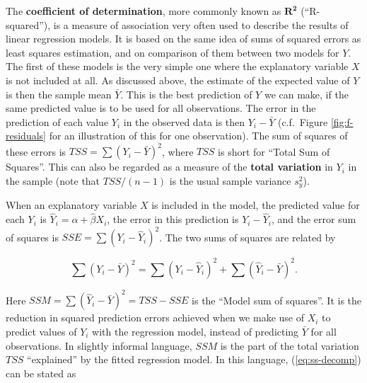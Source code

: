 \documentclass[11pt,a4paper,openany]{book}
\begin{document}
The \textbf{coefficient of determination}, more commonly known as
\(\mathbf{R^{2}}\) (``R-squared''), is a measure of association very
often used to describe the results of linear regression models. It is
based on the same idea of sums of squared errors as least squares
estimation, and on comparison of them between two models for \(Y\). The
first of these models is the very simple one where the explanatory
variable \(X\) is not included at all. As discussed above, the estimate
of the expected value of \(Y\) is then the sample mean \(\bar{Y}\). This
is the best prediction of \(Y\) we can make, if the same predicted value
is to be used for all observations. The error in the prediction of each
value \(Y_{i}\) in the observed data is then \(Y_{i}-\bar{Y}\)
(c.f.~Figure \ref{fig:f-residuals} for an illustration of this for one
observation). The sum of squares of these errors is
\(TSS=\sum (Y_{i}-\bar{Y})^{2}\), where \(TSS\) is short for ``Total Sum
of Squares''. This can also be regarded as a measure of the
\textbf{total variation} in \(Y_{i}\) in the sample (note that
\(TSS/(n-1)\) is the usual sample variance \(s^{2}_{y}\)).

When an explanatory variable \(X\) is included in the model, the
predicted value for each \(Y_{i}\) is
\(\hat{Y}_{i}=\hat{\alpha}+\hat{\beta}X_{i}\), the error in this
prediction is \(Y_{i}-\hat{Y}_{i}\), and the error sum of squares is
\(SSE=\sum (Y_{i}-\hat{Y}_{i})^{2}\). The two sums of squares are
related by

\begin{equation}\sum (Y_{i}-\bar{Y})^{2} =\sum (Y_{i}-\hat{Y}_{i})^{2} +\sum
(\hat{Y}_{i}-\bar{Y})^{2}.
\label{eq:ss-decomp}\end{equation}

Here \(SSM=\sum (\hat{Y}_{i}-\bar{Y})^{2}=TSS-SSE\) is the ``Model sum
of squares''. It is the reduction in squared prediction errors achieved
when we make use of \(X_{i}\) to predict values of \(Y_{i}\) with the
regression model, instead of predicting \(\bar{Y}\) for all
observations. In slightly informal language, \(SSM\) is the part of the
total variation \(TSS\) ``explained'' by the fitted regression model. In
this language, (\ref{eq:ss-decomp}) can be stated as
\end{document}
